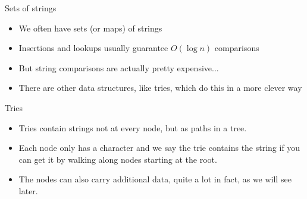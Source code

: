 \documentclass{beamer}
\begin{document}
\begin{frame}[plain]{Sets of strings}
    \begin{itemize}
\item We often have sets (or maps) of strings
\item Insertions and lookups usually guarantee $O(\log n)$ comparisons
    \vspace{10pt}
\item But string comparisons are actually pretty expensive...
    \vspace{10pt}
\item There are other data structures, like tries, which do this in a more clever way
    \end{itemize}
\end{frame}

\begin{frame}[plain]{Tries}
	\begin{itemize}
        \item Tries contain strings not at every node, but as paths in a tree.
        \item Each node only has a character and we say the trie contains the string if you can get it by walking along nodes starting at the root.
        \item The nodes can also carry additional data, quite a lot in fact, as we will see later.
    \end{itemize}
\end{frame}
\end{document}
